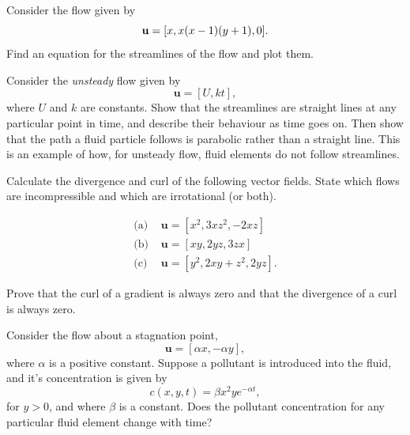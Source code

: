 \begin{problem}[Streamlines]
Consider the flow given by 
\[
\mathbf{u} = [x, x(x-1)(y+1), 0].
\]
Find an equation for the streamlines of the flow and plot them.
\end{problem}

\begin{problem}
\label{prob_unsteady}
Consider the \emph{unsteady} flow given by
\[
\mathbf{u} = [U, kt],
\]
where $U$ and $k$ are constants.  Show that the streamlines are straight lines at any particular point in time, and describe their behaviour as time goes on.  Then show that the path a fluid particle follows is parabolic rather than a straight line.  This is an example of how, for unsteady flow, fluid elements do not follow streamlines.

\end{problem}

\begin{problem}

Calculate the divergence and curl of the following vector fields.  State which flows are incompressible and which are irrotational (or both).

\begin{align*}
\text{(a) } & \mathbf{u} = [x^2, 3xz^2, -2xz] \\
\text{(b) } & \mathbf{u} = [xy, 2yz, 3zx] \\
\text{(c) } & \mathbf{u} = [y^2, 2xy+z^2, 2yz].
\end{align*}

\end{problem}

\begin{problem}
\label{prob_vc2}
Prove that the curl of a gradient  is always zero and that the divergence of a curl is always zero.

\end{problem}


\begin{problem}
Consider the flow about a stagnation point,
\[
\mathbf{u} = [\alpha x, -\alpha y],
\]
where $\alpha$ is a positive constant.  Suppose a pollutant is introduced into the fluid, and it's concentration is given by
\[
c(x, y, t) = \beta x^2 y e^{-\alpha t},
\]
for $y>0$, and where $\beta$ is a constant.  Does the pollutant concentration for any particular fluid element change with time?
\end{problem}

